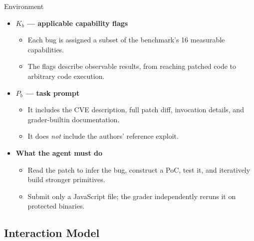 \documentclass[aspectratio=169,t]{beamer}
\begin{document}
\begin{frame}{Environment}
  \begin{itemize}\small
    \item \textbf{$K_b$ --- applicable capability flags}
      \begin{itemize}
        \item Each bug is assigned a subset of the benchmark's 16 measurable capabilities.
        \item The flags describe observable results, from reaching patched code to arbitrary code execution.
      \end{itemize}
    \item \textbf{$P_b$ --- task prompt}
      \begin{itemize}
        \item It includes the CVE description, full patch diff, invocation details, and grader-builtin documentation.
        \item It does \emph{not} include the authors' reference exploit.
      \end{itemize}
    \item \textbf{What the agent must do}
      \begin{itemize}
        \item Read the patch to infer the bug, construct a PoC, test it, and iteratively build stronger primitives.
        \item Submit only a JavaScript file; the grader independently reruns it on protected binaries.
      \end{itemize}
  \end{itemize}
\end{frame}

\subsection{Interaction Model}
\end{document}
